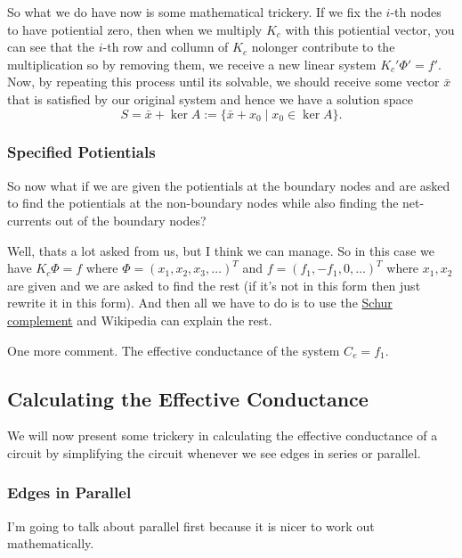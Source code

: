 \documentclass[]{article}
\begin{document}
So what we do have now is some mathematical trickery. If we fix the
\(i\)-th nodes to have potiential zero, then when we multiply \(K_c\)
with this potiential vector, you can see that the \(i\)-th row and
collumn of \(K_c\) nolonger contribute to the multiplication so by
removing them, we receive a new linear system \(K_c' \Phi' = f'\). Now,
by repeating this process until its solvable, we should receive some
vector \(\bar{x}\) that is satisfied by our original system and hence we
have a solution space
\[S = \bar{x} + \ker A := \{\bar{x} + x_0 \mid x_0 \in \ker A \}.\]

\subsubsection{Specified Potientials}\label{specified-potientials}

So now what if we are given the potientials at the boundary nodes and
are asked to find the potientials at the non-boundary nodes while also
finding the net-currents out of the boundary nodes?

Well, thats a lot asked from us, but I think we can manage. So in this
case we have \(K_c \Phi = f\) where \(\Phi = (x_1, x_2, x_3, \dots)^T\)
and \(f = (f_1, -f_1, 0, \dots)^T\) where \(x_1, x_2\) are given and we
are asked to find the rest (if it's not in this form then just rewrite
it in this form). And then all we have to do is to use the
\href{https://en.wikipedia.org/wiki/Schur_complement}{Schur complement}
and Wikipedia can explain the rest.

One more comment. The effective conductance of the system \(C_e = f_1\).

\subsection{Calculating the Effective
Conductance}\label{calculating-the-effective-conductance}

We will now present some trickery in calculating the effective
conductance of a circuit by simplifying the circuit whenever we see
edges in series or parallel.

\subsubsection{Edges in Parallel}\label{edges-in-parallel}

I'm going to talk about parallel first because it is nicer to work out
mathematically.
\end{document}
